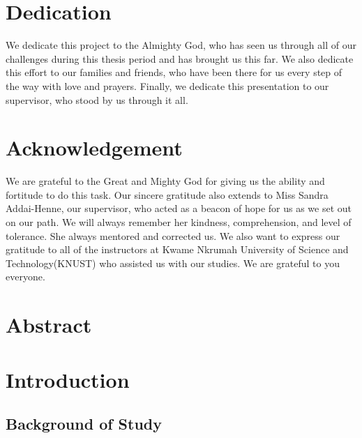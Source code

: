 \documentclass[doublespacing]{report} [12px]%
\begin{document}
\newpage
\chapter*{Dedication}

We dedicate this project to the Almighty God, who has seen us through all of our challenges during this thesis period and has brought us this far. We also dedicate this effort to our families and friends, who have been there for us every step of the way with love and prayers. Finally, we dedicate this presentation to our supervisor, who stood by us through it all.  

\newpage
\chapter*{Acknowledgement}

We are grateful to the Great and Mighty God for giving us the ability and fortitude to do this task. Our sincere gratitude also extends to Miss Sandra Addai-Henne, our supervisor, who acted as a beacon of hope for us as we set out on our path. We will always remember her kindness, comprehension, and level of tolerance. She always mentored and corrected us. We also want to express our gratitude to all of the instructors at Kwame Nkrumah University of Science and Technology(KNUST) who assisted us with our studies. We are grateful to you everyone.  


\newpage
\tableofcontents

\newpage
\listoffigures

\newpage
\listoftables



 
\newpage
\chapter*{Abstract}



\newpage
\chapter{Introduction}


\section{Background of Study}
\end{document}
